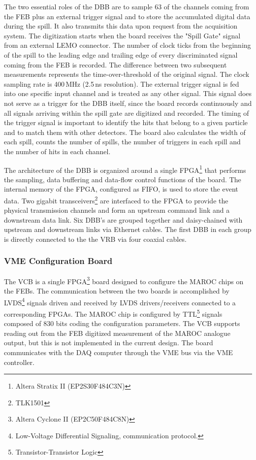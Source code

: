 \documentclass[a4paper,11pt]{article}
\begin{document}
The two essential roles of the DBB are to sample 63 of the channels coming from the FEB plus an external trigger signal and to store the accumulated
digital data during the spill. It also transmits this data upon request from the acquisition system. The digitization starts when the board
receives the "Spill Gate" signal from an external LEMO connector. The number of clock ticks from the beginning of the spill to the leading edge
and trailing edge of every discriminated signal coming from the FEB is recorded. The difference between two subsequent measurements represents
the time-over-threshold of the original signal. The clock sampling rate is 400\,MHz (2.5\,ns resolution). The external trigger signal is fed into
one specific input channel and is treated as any other signal. This signal does not serve as a trigger for the DBB itself, since the board records
continuously and all signals arriving within the spill gate are digitized and recorded. The timing of the trigger signal is important to identify
the hits that belong to a given particle and to match them with other detectors. The board also calculates the width of each spill, counts the number
of spills, the number of triggers in each spill and the number of hits in each channel.

The architecture of the DBB is organized around a single FPGA\footnote{Altera Stratix II (EP2S30F484C3N)} that performs the sampling, data
buffering and data-flow control functions of the board. The internal memory of the FPGA, configured as FIFO, is used to store the event data. Two
gigabit transceivers\footnote{TLK1501} are interfaced to the FPGA to provide the physical transmission channels and form an upstream command link and
a downstream data link. Six DBB's are grouped together and daisy-chained with upstream and downstream links via Ethernet cables. The first DBB in each
group is directly connected to the the VRB via four coaxial cables.

\subsubsection{VME Configuration Board}
The VCB is a single FPGA\footnote{Altera Cyclone II (EP2C50F484C8N)} board designed to configure the MAROC chips on the FEBs. The
communication between the two boards is accomplished by LVDS\footnote{Low-Voltage Differential Signaling, communication protocol.} signals driven and
received by LVDS drivers/receivers connected to a corresponding FPGAs. The MAROC chip is configured by TTL\footnote{Transistor-Transistor
Logic} signals composed of 830 bits coding the configuration parameters. The VCB supports reading out from the FEB digitized measurement of the
MAROC analogue output, but this is not implemented in the current design. The board communicates with the DAQ computer through the VME bus via the
VME controller. 
\end{document}
